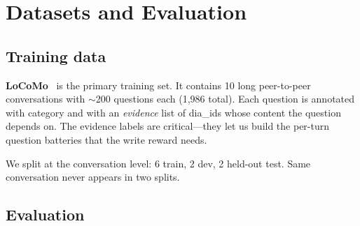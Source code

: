 \documentclass[11pt]{article}
\begin{document}
\section{Datasets and Evaluation}
\label{sec:datasets}

\subsection{Training data}

\textbf{LoCoMo}~\cite{maharana2024locomo} is the primary training set. It
contains 10 long peer-to-peer conversations with $\sim$200 questions
each (1,986 total). Each question is annotated with category and with an
\emph{evidence} list of dia\_ids whose content the question depends on.
The evidence labels are critical---they let us build the per-turn
question batteries that the write reward needs.

We split at the conversation level: 6 train, 2 dev, 2 held-out test.
Same conversation never appears in two splits.

\subsection{Evaluation}
\end{document}
